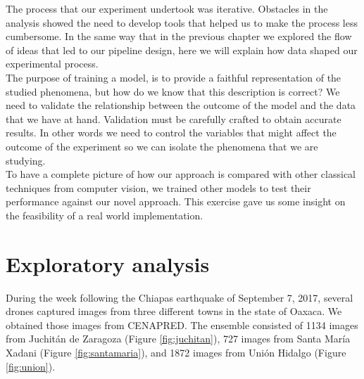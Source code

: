 The process that our experiment undertook was iterative. Obstacles in the analysis showed the need to develop tools that helped us to make the process less cumbersome. In the same way that in the previous chapter we explored the flow of ideas that led to our pipeline design, here we will explain how data shaped our experimental process.\\

The purpose of training a model, is to provide a faithful representation of the  studied phenomena, but how do we know that this description is correct? We need to validate the relationship between the outcome of the model and the data that we have at hand. Validation must be carefully crafted to obtain accurate results. In other words we need to control the variables that might affect the outcome of the experiment so we can isolate the phenomena that we are studying.\\

To have a complete picture of how our approach is compared with other classical techniques from  computer vision, we trained other models to test their performance against our novel approach. This exercise gave us some insight on the feasibility of a real world implementation.\\


\section{Exploratory analysis}

During the week following the Chiapas earthquake of September 7, 2017, several drones captured images from three different towns in the state of Oaxaca. We obtained those images from CENAPRED. The ensemble consisted of 1134 images from Juchit\'an de Zaragoza (Figure \ref{fig:juchitan}), 727 images from Santa Mar\'ia Xadani (Figure \ref{fig:santamaria}), and 1872 images from Uni\'on Hidalgo (Figure \ref{fig:union}).\\

